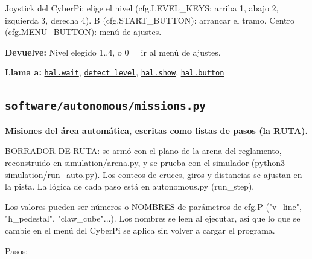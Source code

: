 Joystick del CyberPi: elige el nivel (cfg.LEVEL\_KEYS: arriba 1, abajo 2, izquierda 3, derecha 4). B (cfg.START\_BUTTON): arrancar el tramo. Centro (cfg.MENU\_BUTTON): menú de ajustes.

\par{}\par\smallskip
\noindent\textbf{Devuelve:} Nivel elegido 1..4, o 0 = ir al menú de ajustes.\par
\noindent\textbf{Llama a:} \hyperref[fn:hal:wait]{\texttt{hal.wait}}, \hyperref[fn:autonomous:detect-level]{\texttt{detect\_\allowbreak{}level}}, \hyperref[fn:hal:show]{\texttt{hal.show}}, \hyperref[fn:hal:button]{\texttt{hal.button}}\par

\subsection{\texttt{software/autonomous/missions.py}}\label{mod:missions}
\textbf{Misiones del área automática, escritas como listas de pasos (la RUTA).}

BORRADOR DE RUTA: se armó con el plano de la arena del reglamento, reconstruido en simulation/arena.py, y se prueba con el simulador (python3 simulation/run\_auto.py). Los conteos de cruces, giros y distancias se ajustan en la pista. La lógica de cada paso está en autonomous.py (run\_step).

Los valores pueden ser números o NOMBRES de parámetros de cfg.P ("v\_line", "h\_pedestal", "claw\_cube"...). Los nombres se leen al ejecutar, así que lo que se cambie en el menú del CyberPi se aplica sin volver a cargar el programa.

Pasos:

